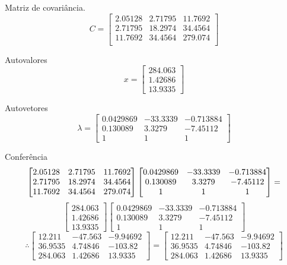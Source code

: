 \documentclass[a4paper, 11pt]{article}
\begin{document}
Matriz de covariância.
$$ C =
\begin{bmatrix}
2.05128&2.71795&11.7692\\
2.71795&18.2974&34.4564\\
11.7692&34.4564&279.074\\
\end{bmatrix}
$$

Autovalores
$$ x =
\begin{bmatrix}
284.063\\
1.42686\\
13.9335
\end{bmatrix}
$$

Autovetores
$$ \lambda =
\begin{bmatrix}
0.0429869&-33.3339&-0.713884\\
0.130089&3.3279&-7.45112\\
1&1&1
\end{bmatrix}
$$

Conferência
$$
\begin{bmatrix}
2.05128&2.71795&11.7692\\
2.71795&18.2974&34.4564\\
11.7692&34.4564&279.074\\
\end{bmatrix}
\begin{bmatrix}
0.0429869&-33.3339&-0.713884\\
0.130089&3.3279&-7.45112\\
1&1&1
\end{bmatrix}
\linebreak
=
$$
$$
\begin{bmatrix}
284.063\\
1.42686\\
13.9335
\end{bmatrix}
\begin{bmatrix}
0.0429869&-33.3339&-0.713884\\
0.130089&3.3279&-7.45112\\
1&1&1
\end{bmatrix}
$$
$$
\therefore
\begin{bmatrix}
12.211&-47.563&-9.94692\\
36.9535&4.74846&-103.82\\
284.063&1.42686&13.9335
\end{bmatrix}
=
\begin{bmatrix}
12.211&-47.563&-9.94692\\
36.9535&4.74846&-103.82\\
284.063&1.42686&13.9335
\end{bmatrix}
$$
\end{document}
